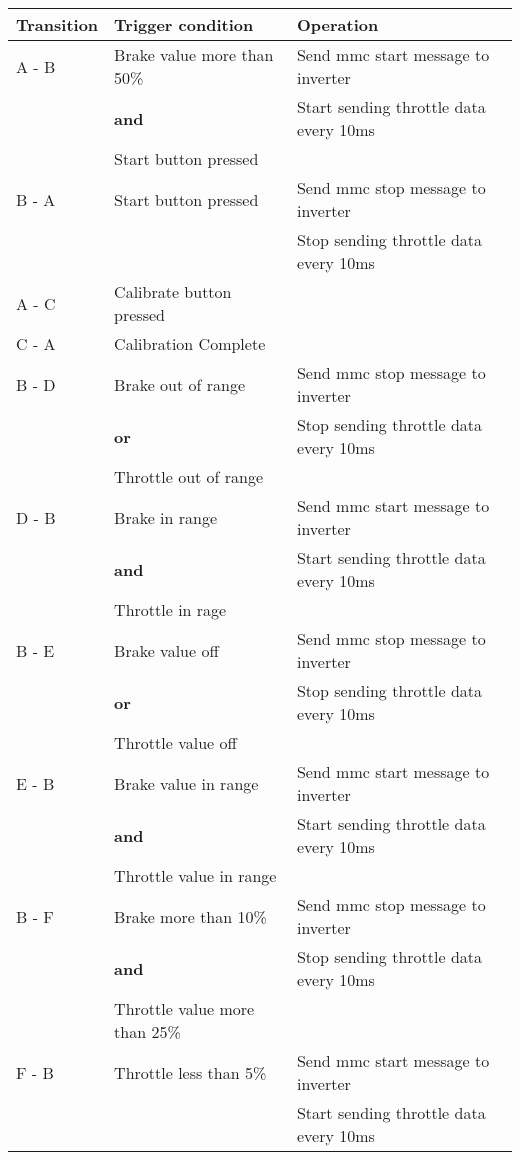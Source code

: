 \documentclass{article}
\begin{document}
\begin{tabular}{lll} \toprule
    {Transition} & {Trigger condition} & {Operation} \\ \midrule
    {A - B} & {Brake value more than 50\%} & {Send mmc start message to inverter} \\
    {     } & {\textbf{and}} & {Start sending throttle data every 10ms} \\
    {     } & {Start button pressed} \\ \midrule
    {B - A} & {Start button pressed} & {Send mmc stop message to inverter} \\
    {     } & { } & {Stop sending throttle data every 10ms} \\ \midrule
    {A - C} & {Calibrate button pressed}  \\ \midrule
    {C - A} & {Calibration Complete} \\ \midrule
    {B - D} & {Brake out of range} & {Send mmc stop message to inverter} \\
    {     } & {\textbf{or}} & {Stop sending throttle data every 10ms} \\
    {     } & {Throttle out of range} \\ \midrule
    {D - B} & {Brake in range} & {Send mmc start message to inverter} \\
    {     } & {\textbf{and}} & {Start sending throttle data every 10ms} \\
    {     } & {Throttle in rage} \\ \midrule
    {B - E} & {Brake value off} & {Send mmc stop message to inverter} \\
    {     } & {\textbf{or}} & {Stop sending throttle data every 10ms} \\
    {     } & {Throttle value off} \\ \midrule
    {E - B} & {Brake value in range} & {Send mmc start message to inverter} \\
    {     } & {\textbf{and}} & {Start sending throttle data every 10ms} \\
    {     } & {Throttle value in range} \\ \midrule
    {B - F} & {Brake more than 10\%} & {Send mmc stop message to inverter} \\
    {     } & {\textbf{and}} & {Stop sending throttle data every 10ms} \\
    {     } & {Throttle value more than 25\%} \\ \midrule
    {F - B} & {Throttle less than 5\%} & {Send mmc start message to inverter} \\
    {     } & { } & {Start sending throttle data every 10ms} \\ \bottomrule



\end{tabular}
\end{document}
